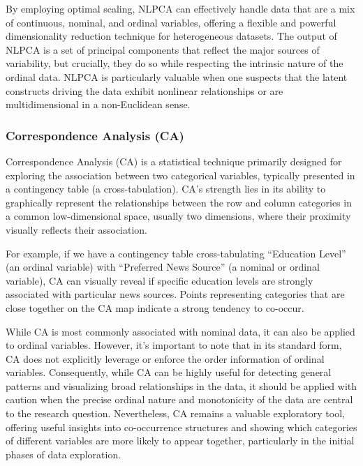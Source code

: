 \documentclass[
  letterpaper,
  DIV=11,
  numbers=noendperiod]{scrartcl}
\begin{document}
By employing optimal scaling, NLPCA can effectively handle data that are
a mix of continuous, nominal, and ordinal variables, offering a flexible
and powerful dimensionality reduction technique for heterogeneous
datasets. The output of NLPCA is a set of principal components that
reflect the major sources of variability, but crucially, they do so
while respecting the intrinsic nature of the ordinal data. NLPCA is
particularly valuable when one suspects that the latent constructs
driving the data exhibit nonlinear relationships or are multidimensional
in a non-Euclidean sense.

\hypertarget{correspondence-analysis-ca}{%
\subsubsection{Correspondence Analysis
(CA)}\label{correspondence-analysis-ca}}

Correspondence Analysis (CA) is a statistical technique primarily
designed for exploring the association between two categorical
variables, typically presented in a contingency table (a
cross-tabulation). CA's strength lies in its ability to graphically
represent the relationships between the row and column categories in a
common low-dimensional space, usually two dimensions, where their
proximity visually reflects their association.

For example, if we have a contingency table cross-tabulating ``Education
Level'' (an ordinal variable) with ``Preferred News Source'' (a nominal
or ordinal variable), CA can visually reveal if specific education
levels are strongly associated with particular news sources. Points
representing categories that are close together on the CA map indicate a
strong tendency to co-occur.

While CA is most commonly associated with nominal data, it can also be
applied to ordinal variables. However, it's important to note that in
its standard form, CA does not explicitly leverage or enforce the order
information of ordinal variables. Consequently, while CA can be highly
useful for detecting general patterns and visualizing broad
relationships in the data, it should be applied with caution when the
precise ordinal nature and monotonicity of the data are central to the
research question. Nevertheless, CA remains a valuable exploratory tool,
offering useful insights into co-occurrence structures and showing which
categories of different variables are more likely to appear together,
particularly in the initial phases of data exploration.
\end{document}
